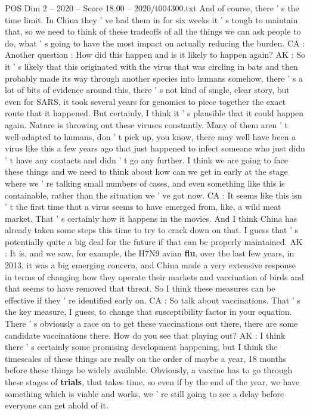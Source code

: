 \begin{textsample}{POS Dim 2 – 2020 – Score 18.00 – 2020/t004300.txt}
And of course, there ' s the time limit.
In China they ' ve had them in for six weeks it ' s tough to maintain that, so we need to think of these tradeoffs of all the things we can ask people to do, what ' s going to have the most impact on actually reducing the burden.
CA : Another question : How did this happen and is it likely to happen again?
AK : So it ' s likely that this originated with the virus that was circling in bats and then probably made its way through another species into humans somehow, there ' s a lot of bits of evidence around this, there ' s not kind of single, clear story, but even for SARS, it took several years for genomics to piece together the exact route that it happened.
But certainly, I think it ' s plausible that it could happen again.
Nature is throwing out these viruses constantly.
Many of them aren ' t well-adapted to humans, don ' t pick up, you know, there may well have been a virus like this a few years ago that just happened to infect someone who just didn ' t have any contacts and didn ' t go any further.
I think we are going to face these things and we need to think about how can we get in early at the stage where we ' re talking small numbers of cases, and even something like this is containable, rather than the situation we ' ve got now.
CA : It seems like this isn ' t the first time that a virus seems to have emerged from, like, a wild meat market.
That ' s certainly how it happens in the movies.
And I think China has already taken some steps this time to try to crack down on that.
I guess that ' s potentially quite a big deal for the future if that can be properly maintained.
AK : It is, and we saw, for example, the H7N9 avian \textbf{flu}, over the last few years, in 2013, it was a big emerging concern, and China made a very extensive response in terms of changing how they operate their markets and vaccination of birds and that seems to have removed that threat.
So I think these measures can be effective if they ' re identified early on.
CA : So talk about vaccinations.
That ' s the key measure, I guess, to change that susceptibility factor in your equation.
There ' s obviously a race on to get these vaccinations out there, there are some candidate vaccinations there.
How do you see that playing out?
AK : I think there ' s certainly some promising development happening, but I think the timescales of these things are really on the order of maybe a year, 18 months before these things be widely available.
Obviously, a vaccine has to go through these stages of \textbf{trials}, that takes time, so even if by the end of the year, we have something which is viable and works, we ' re still going to see a delay before everyone can get ahold of it.

\end{textsample}
